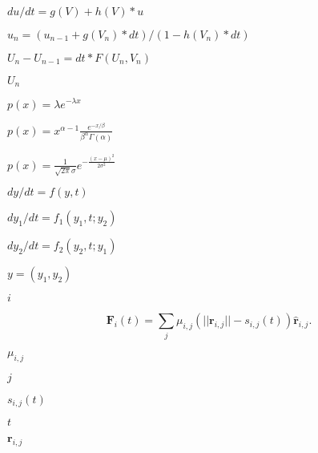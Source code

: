 \documentclass{article}
\begin{document}
$du/dt = g(V) + h(V)*u$
\pagebreak

$u_n = ( u_{n-1} + g(V_n)*dt ) / ( 1 - h(V_n)*dt )$
\pagebreak

$U_n - U_{n-1} = dt*F(U_n, V_n)$
\pagebreak

$U_n$
\pagebreak

$\displaystyle p(x) = \lambda e^{-\lambda x}$
\pagebreak

$\displaystyle p(x) = x^{\alpha-1}\frac{e^{-x/\beta}}{\beta^\alpha\Gamma(\alpha)}$
\pagebreak

$\displaystyle p(x) = \frac{1}{\sqrt{2\pi}\sigma} e^{-\frac{(x-\mu)^2}{2\sigma^2}} $
\pagebreak

$dy/dt = f(y, t)$
\pagebreak

$dy_1/dt = f_1(y_1, t; y_2)$
\pagebreak

$dy_2/dt = f_2(y_2, t; y_1)$
\pagebreak

$y = (y_1, y_2)$
\pagebreak

$i$
\pagebreak

\[ \mathbf{F}_{i}(t) = \sum_{j} \mu_{i,j} ( || \mathbf{r}_{i,j} || - s_{i,j}(t) ) \hat{\mathbf{r}}_{i,j}. \]
\pagebreak

$\mu_{i,j}$
\pagebreak

$j$
\pagebreak

$s_{i,j}(t)$
\pagebreak

$t$
\pagebreak

$\mathbf{r}_{i,j}$
\pagebreak

$\hat{}$
\pagebreak
\end{document}
